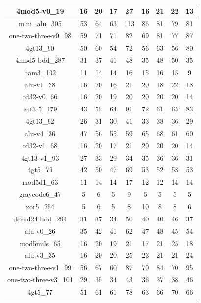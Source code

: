\begin{longtable}[c]{|c|c|c|c|c|c|c|c|c|}
4mod5-v0\_19 & 16 & 20 & 17 & 27 & 16 & 21 & 22 & 13 \\ \hline
mini\_alu\_305 & 53 & 64 & 63 & 113 & 86 & 81 & 79 & 81 \\ \hline
one-two-three-v0\_98 & 59 & 71 & 71 & 82 & 69 & 81 & 77 & 87 \\ \hline
4gt13\_90 & 50 & 60 & 54 & 72 & 56 & 63 & 56 & 80 \\ \hline
4mod5-bdd\_287 & 31 & 37 & 41 & 48 & 35 & 48 & 50 & 35 \\ \hline
ham3\_102 & 11 & 14 & 14 & 16 & 15 & 16 & 15 & 9 \\ \hline
alu-v1\_28 & 16 & 20 & 16 & 21 & 20 & 18 & 22 & 18 \\ \hline
rd32-v0\_66 & 16 & 20 & 19 & 20 & 20 & 20 & 20 & 14 \\ \hline
cnt3-5\_179 & 43 & 52 & 64 & 91 & 72 & 61 & 65 & 83 \\ \hline
4gt13\_92 & 26 & 31 & 30 & 41 & 33 & 38 & 36 & 29 \\ \hline
alu-v4\_36 & 47 & 56 & 55 & 59 & 65 & 68 & 61 & 60 \\ \hline
rd32-v1\_68 & 16 & 20 & 17 & 21 & 20 & 20 & 20 & 14 \\ \hline
4gt13-v1\_93 & 27 & 33 & 29 & 34 & 35 & 36 & 36 & 31 \\ \hline
4gt5\_76 & 42 & 50 & 47 & 69 & 53 & 52 & 53 & 53 \\ \hline
mod5d1\_63 & 11 & 14 & 14 & 17 & 12 & 12 & 14 & 14 \\ \hline
graycode6\_47 & 5 & 6 & 5 & 9 & 5 & 5 & 5 & 5 \\ \hline
xor5\_254 & 5 & 6 & 5 & 8 & 10 & 8 & 8 & 6 \\ \hline
decod24-bdd\_294 & 31 & 37 & 34 & 50 & 40 & 40 & 46 & 37 \\ \hline
alu-v0\_26 & 35 & 42 & 41 & 62 & 47 & 48 & 45 & 54 \\ \hline
mod5mils\_65 & 16 & 20 & 19 & 21 & 17 & 21 & 25 & 18 \\ \hline
alu-v3\_35 & 16 & 20 & 20 & 25 & 23 & 21 & 21 & 24 \\ \hline
one-two-three-v1\_99 & 56 & 67 & 60 & 87 & 70 & 84 & 70 & 95 \\ \hline
one-two-three-v3\_101 & 29 & 35 & 34 & 43 & 36 & 37 & 38 & 46 \\ \hline
4gt5\_77 & 51 & 61 & 61 & 78 & 63 & 66 & 70 & 66 \\ \hline
\end{longtable}

